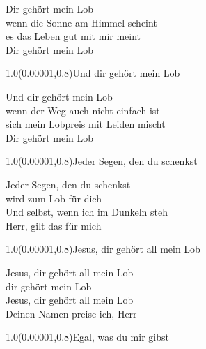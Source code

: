 \documentclass[aspectratio=169]{beamer}
\begin{document}
\begin{frame}
\centering
\color{white}
\huge{Dir gehört mein Lob} \\
\huge{wenn die Sonne am Himmel scheint} \\
\huge{es das Leben gut mit mir meint} \\
\huge{Dir gehört mein Lob} \\

\begin{textblock}{1.0}(0.00001,0.8)\color{gray}\normalsize{Und dir gehört mein Lob}\end{textblock}
\end{frame}

\begin{frame}
\centering
\color{white}
\huge{Und dir gehört mein Lob} \\
\huge{wenn der Weg auch nicht einfach ist} \\
\huge{sich mein Lobpreis mit Leiden mischt} \\
\huge{Dir gehört mein Lob} \\

\begin{textblock}{1.0}(0.00001,0.8)\color{gray}\normalsize{Jeder Segen, den du schenkst}\end{textblock}
\end{frame}

\begin{frame}
\centering
\color{white}
\huge{Jeder Segen, den du schenkst} \\
\huge{wird zum Lob für dich} \\
\huge{Und selbst, wenn ich im Dunkeln steh} \\
\huge{Herr, gilt das für mich} \\

\begin{textblock}{1.0}(0.00001,0.8)\color{gray}\normalsize{Jesus, dir gehört all mein Lob}\end{textblock}
\end{frame}

\begin{frame}
\centering
\color{white}
\huge{Jesus, dir gehört all mein Lob} \\
\huge{dir gehört mein Lob} \\
\huge{Jesus, dir gehört all mein Lob} \\
\huge{Deinen Namen preise ich, Herr} \\

\begin{textblock}{1.0}(0.00001,0.8)\color{gray}\normalsize{Egal, was du mir gibst}\end{textblock}
\end{frame}
\end{document}
